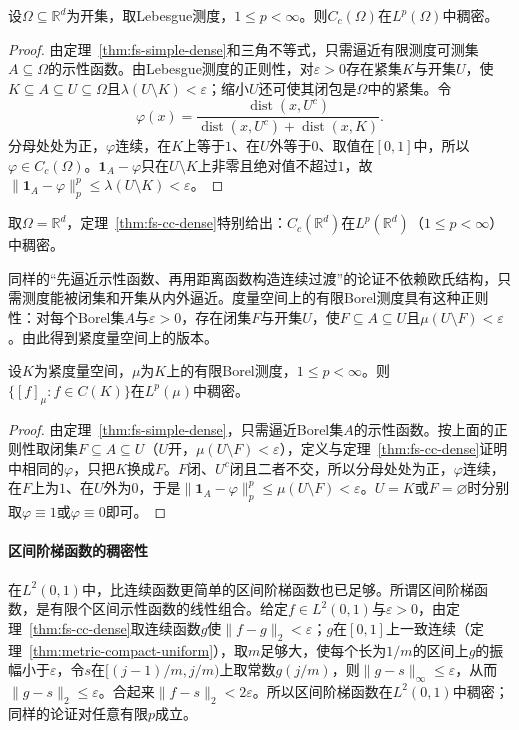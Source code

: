 \begin{theorem}
\label{thm:fs-cc-dense}
设$\Omega\subseteq\mathbb R^d$为开集，取Lebesgue测度，$1\leq p<\infty$。则$C_c(\Omega)$在$L^p(\Omega)$中稠密。
\end{theorem}

\begin{proof}
由定理~\ref{thm:fs-simple-dense}和三角不等式，只需逼近有限测度可测集$A\subseteq\Omega$的示性函数。由Lebesgue测度的正则性，对$\varepsilon>0$存在紧集$K$与开集$U$，使$K\subseteq A\subseteq U\subseteq\Omega$且$\lambda(U\setminus K)<\varepsilon$；缩小$U$还可使其闭包是$\Omega$中的紧集。令
\[
 \varphi(x)=\frac{\operatorname{dist}(x,U^c)}{\operatorname{dist}(x,U^c)+\operatorname{dist}(x,K)} .
\]
分母处处为正，$\varphi$连续，在$K$上等于$1$、在$U$外等于$0$、取值在$[0,1]$中，所以$\varphi\in C_c(\Omega)$。$\mathbf 1_A-\varphi$只在$U\setminus K$上非零且绝对值不超过$1$，故$\|\mathbf 1_A-\varphi\|_p^p\leq\lambda(U\setminus K)<\varepsilon$。
\end{proof}

取$\Omega=\mathbb R^d$，定理~\ref{thm:fs-cc-dense}特别给出：$C_c(\mathbb R^d)$在$L^p(\mathbb R^d)$（$1\leq p<\infty$）中稠密。

同样的“先逼近示性函数、再用距离函数构造连续过渡”的论证不依赖欧氏结构，只需测度能被闭集和开集从内外逼近。度量空间上的有限Borel测度具有这种正则性：对每个Borel集$A$与$\varepsilon>0$，存在闭集$F$与开集$U$，使$F\subseteq A\subseteq U$且$\mu(U\setminus F)<\varepsilon$。由此得到紧度量空间上的版本。

\begin{theorem}[紧度量空间上连续函数的稠密性]
\label{thm:fs-continuous-dense-compact}
设$K$为紧度量空间，$\mu$为$K$上的有限Borel测度，$1\leq p<\infty$。则$\{[f]_\mu:f\in C(K)\}$在$L^p(\mu)$中稠密。
\end{theorem}

\begin{proof}
由定理~\ref{thm:fs-simple-dense}，只需逼近Borel集$A$的示性函数。按上面的正则性取闭集$F\subseteq A\subseteq U$（$U$开，$\mu(U\setminus F)<\varepsilon$），定义与定理~\ref{thm:fs-cc-dense}证明中相同的$\varphi$，只把$K$换成$F$。$F$闭、$U^c$闭且二者不交，所以分母处处为正，$\varphi$连续，在$F$上为$1$、在$U$外为$0$，于是$\|\mathbf 1_A-\varphi\|_p^p\leq\mu(U\setminus F)<\varepsilon$。$U=K$或$F=\varnothing$时分别取$\varphi\equiv1$或$\varphi\equiv0$即可。
\end{proof}

\paragraph{区间阶梯函数的稠密性}
在$L^2(0,1)$中，比连续函数更简单的区间阶梯函数也已足够。所谓区间阶梯函数，是有限个区间示性函数的线性组合。给定$f\in L^2(0,1)$与$\varepsilon>0$，由定理~\ref{thm:fs-cc-dense}取连续函数$g$使$\|f-g\|_2<\varepsilon$；$g$在$[0,1]$上一致连续（定理~\ref{thm:metric-compact-uniform}），取$m$足够大，使每个长为$1/m$的区间上$g$的振幅小于$\varepsilon$，令$s$在$[(j-1)/m,j/m)$上取常数$g(j/m)$，则$\|g-s\|_\infty\leq\varepsilon$，从而$\|g-s\|_2\leq\varepsilon$。合起来$\|f-s\|_2<2\varepsilon$。所以区间阶梯函数在$L^2(0,1)$中稠密；同样的论证对任意有限$p$成立。

